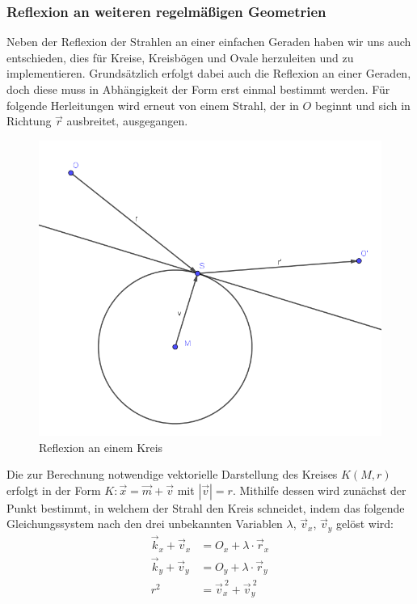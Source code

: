 \documentclass[reducespace,stylepage,semiarbeit]{spezidoc}
\begin{document}
\subsubsection{Reflexion an weiteren regelmäßigen Geometrien} \label{sec:weitereGeometrien}
Neben der Reflexion der Strahlen an einer einfachen Geraden haben wir uns auch entschieden, dies für Kreise, Kreisbögen und Ovale herzuleiten und zu implementieren. 
Grundsätzlich erfolgt dabei auch die Reflexion an einer Geraden, doch diese muss in Abhängigkeit der Form erst einmal bestimmt werden. 
Für folgende Herleitungen wird erneut von einem Strahl, der in $O$ beginnt und sich in Richtung $\vec{r}$ ausbreitet, ausgegangen.
\begin{figure}
\includegraphics[scale=0.5]{pictures/CircleRef.png}
\caption{Reflexion an einem Kreis}
\end{figure}
Die zur Berechnung notwendige vektorielle Darstellung des Kreises $K(M, r)$ erfolgt in der Form $K: \vec{x} = \vec{m} + \vec{v}$ mit $|\vec{v}| = r$.
Mithilfe dessen wird zunächst der Punkt bestimmt, in welchem der Strahl den Kreis schneidet, indem das folgende Gleichungssystem nach den drei unbekannten Variablen $\lambda$, $\vec{v}_x$, $\vec{v}_y$ gelöst wird:
\begin{equation*}
\begin{split}
\vec{k}_x + \vec{v}_x & = O_x + \lambda\cdot\vec{r}_x\\
\vec{k}_y + \vec{v}_y & = O_y + \lambda\cdot\vec{r}_y\\
r^2 & = \vec{v}_x^{~2} + \vec{v}_y^{~2} 
\end{split}
\end{equation*}
\end{document}
